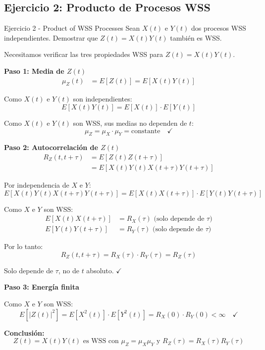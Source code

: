 \documentclass[10pt,a4paper]{article}
\begin{document}
\newpage
\subsection{Ejercicio 2: Producto de Procesos WSS}

\begin{ejercicio}{Ejercicio 2 - Product of WSS Processes}
Sean $X(t)$ e $Y(t)$ dos procesos WSS independientes. Demostrar que $Z(t) = X(t)Y(t)$ también es WSS.
\end{ejercicio}

\begin{solucion}
Necesitamos verificar las tres propiedades WSS para $Z(t) = X(t)Y(t)$.

\textbf{Paso 1: Media de $Z(t)$}
\begin{align*}
\mu_Z(t) &= E[Z(t)] = E[X(t)Y(t)]
\end{align*}

Como $X(t)$ e $Y(t)$ son independientes:
\[
E[X(t)Y(t)] = E[X(t)] \cdot E[Y(t)]
\]

Como $X(t)$ e $Y(t)$ son WSS, sus medias no dependen de $t$:
\[
\mu_Z = \mu_X \cdot \mu_Y = \text{constante} \quad \checkmark
\]

\textbf{Paso 2: Autocorrelación de $Z(t)$}
\begin{align*}
R_Z(t, t+\tau) &= E[Z(t)Z(t+\tau)]\\
&= E[X(t)Y(t)X(t+\tau)Y(t+\tau)]
\end{align*}

Por independencia de $X$ e $Y$:
\[
E[X(t)Y(t)X(t+\tau)Y(t+\tau)] = E[X(t)X(t+\tau)] \cdot E[Y(t)Y(t+\tau)]
\]

Como $X$ e $Y$ son WSS:
\begin{align*}
E[X(t)X(t+\tau)] &= R_X(\tau) \text{ (solo depende de } \tau)\\
E[Y(t)Y(t+\tau)] &= R_Y(\tau) \text{ (solo depende de } \tau)
\end{align*}

Por lo tanto:
\[
R_Z(t, t+\tau) = R_X(\tau) \cdot R_Y(\tau) = R_Z(\tau)
\]

Solo depende de $\tau$, no de $t$ absoluto. $\checkmark$

\textbf{Paso 3: Energía finita}

Como $X$ e $Y$ son WSS:
\[
E[|Z(t)|^2] = E[X^2(t)] \cdot E[Y^2(t)] = R_X(0) \cdot R_Y(0) < \infty \quad \checkmark
\]

\vspace{3mm}
\textbf{Conclusión:}
\[
\boxed{Z(t) = X(t)Y(t) \text{ es WSS con } \mu_Z = \mu_X\mu_Y \text{ y } R_Z(\tau) = R_X(\tau)R_Y(\tau)}
\]
\end{solucion}
\end{document}
